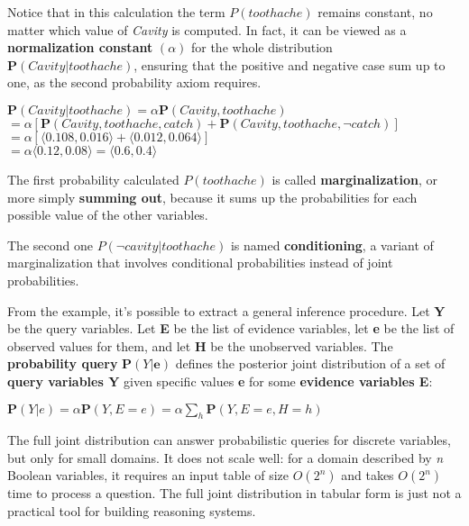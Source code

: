 \begin{example}
    Notice that in this calculation the term $P(toothache)$ remains constant, no matter which value of \textit{Cavity} is computed. In fact, it can be viewed as a \textbf{normalization constant} $(\alpha)$ for the whole distribution $\mathbf{P}(Cavity|toothache)$, ensuring that the positive and negative case sum up to one, as the second probability axiom requires. \vspace*{7pt}

    $\mathbf{P}(Cavity|toothache) = \alpha\mathbf{P}(Cavity, toothache)$ \\
    $= \alpha[\mathbf{P}(Cavity, toothache, catch) + \mathbf{P}(Cavity, toothache, \neg catch)]$ \\
    $= \alpha[\langle0.108, 0.016\rangle + \langle0.012, 0.064\rangle]$ \\
    $= \alpha\langle0.12, 0.08\rangle = \langle0.6, 0.4\rangle$
\end{example}
\begin{definition}
    The first probability calculated $P(toothache)$ is called \textbf{marginalization}, or more simply \textbf{summing out}, because it sums up the probabilities for each possible value of the other variables.
\end{definition}
\begin{definition}
    The second one $P(\neg cavity|toothache)$ is named \textbf{conditioning}, a variant of marginalization that involves conditional probabilities instead of joint probabilities.
\end{definition}
\begin{definition}
    From the example, it's possible to extract a general inference procedure. Let \textbf{Y} be the query variables. Let \textbf{E} be the list of evidence variables, let \textbf{e} be the list of observed values for them, and let \textbf{H} be the unobserved variables. The \textbf{probability query} $\mathbf{P}(Y|\mathbf{e})$ defines the posterior joint distribution of a set of \textbf{query variables Y} given specific values \textbf{e} for some \textbf{evidence variables E}: \vspace{3.5pt}
    \begin{center}
        $\mathbf{P}(Y|e) = \alpha\mathbf{P}(Y, E=e) = \alpha\sum_{h}\mathbf{P}(Y, E=e, H=h)$
    \end{center}
\end{definition}
The full joint distribution can answer probabilistic queries for discrete variables, but only for small domains. It does not scale well: for a domain described by \textit{n} Boolean variables, it requires an input table of size \textit{$O(2^n)$} and takes \textit{$O(2^n)$} time to process a question. The full joint distribution in tabular form is just not a practical tool for building reasoning systems.